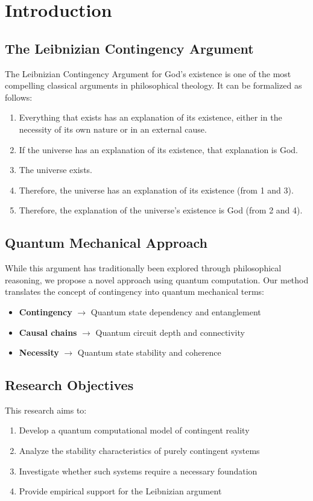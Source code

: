 \section{Introduction}

\subsection{The Leibnizian Contingency Argument}
The Leibnizian Contingency Argument for God's existence is one of the most compelling classical arguments in philosophical theology. It can be formalized as follows:

\begin{enumerate}
    \item Everything that exists has an explanation of its existence, either in the necessity of its own nature or in an external cause.
    \item If the universe has an explanation of its existence, that explanation is God.
    \item The universe exists.
    \item Therefore, the universe has an explanation of its existence (from 1 and 3).
    \item Therefore, the explanation of the universe's existence is God (from 2 and 4).
\end{enumerate}

\subsection{Quantum Mechanical Approach}
While this argument has traditionally been explored through philosophical reasoning, we propose a novel approach using quantum computation. Our method translates the concept of contingency into quantum mechanical terms:

\begin{itemize}
    \item \textbf{Contingency} $\rightarrow$ Quantum state dependency and entanglement
    \item \textbf{Causal chains} $\rightarrow$ Quantum circuit depth and connectivity
    \item \textbf{Necessity} $\rightarrow$ Quantum state stability and coherence
\end{itemize}

\subsection{Research Objectives}
This research aims to:
\begin{enumerate}
    \item Develop a quantum computational model of contingent reality
    \item Analyze the stability characteristics of purely contingent systems
    \item Investigate whether such systems require a necessary foundation
    \item Provide empirical support for the Leibnizian argument
\end{enumerate}

